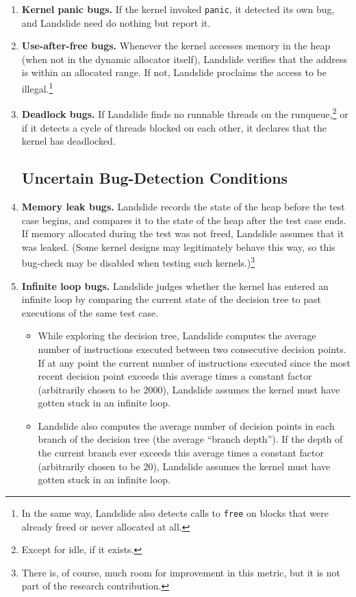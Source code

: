 \begin{enumerate}
	\item {\bf Kernel panic bugs.} If the kernel invoked \texttt{panic}, it detected its own bug, and Landslide need do nothing but report it.
	\item {\bf Use-after-free bugs.} Whenever the kernel accesses memory in the heap (when not in the dynamic allocator itself), Landslide verifies that the address is within an allocated range. If not, Landslide proclaims the access to be illegal.\footnote{In the same way, Landslide also detects calls to \texttt{free} on blocks that were already freed or never allocated at all.}
	\item {\bf Deadlock bugs.} If Landslide finds no runnable threads on the runqueue,\footnote{Except for idle, if it exists.} or if it detects a cycle of threads blocked on each other, it declares that the kernel has deadlocked.

\subsection{Uncertain Bug-Detection Conditions}

	\item {\bf Memory leak bugs.} Landslide records the state of the heap before the test case begins, and compares it to the state of the heap after the test case ends. If memory allocated during the test was not freed, Landslide assumes that it was leaked.
		(Some kernel designs may legitimately behave this way, so this bug-check may be disabled when testing such kernels.)\footnote{There is, of course, much room for improvement in this metric, but it is not part of the research contribution.}
	\item {\bf Infinite loop bugs.} Landslide judges whether the kernel has entered an infinite loop by comparing the current state of the decision tree to past executions of the same test case.
	\begin{itemize}
		\item While exploring the decision tree, Landslide computes the average number of instructions executed between two consecutive decision points. If at any point the current number of instructions executed since the most recent decision point exceeds this average times a constant factor (arbitrarily chosen to be 2000), Landslide assumes the kernel must have gotten stuck in an infinite loop.
		\item Landslide also computes the average number of decision points in each branch of the decision tree (the average ``branch depth''). If the depth of the current branch ever exceeds this average times a constant factor (arbitrarily chosen to be 20), Landslide assumes the kernel must have gotten stuck in an infinite loop.
	\end{itemize}
\end{enumerate}

